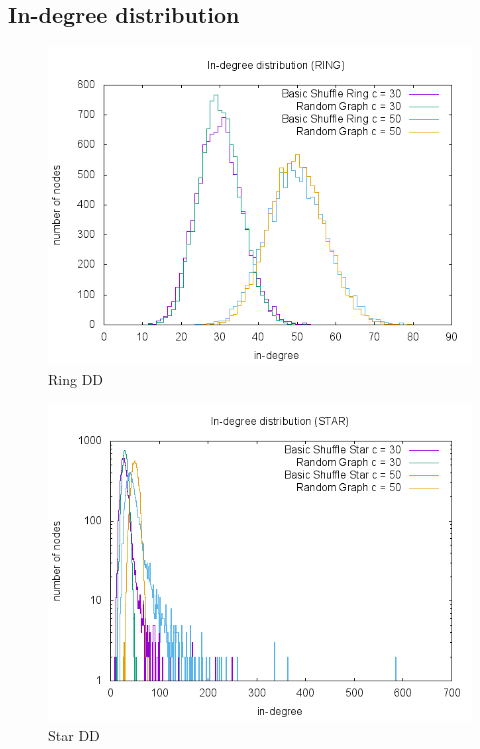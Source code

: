 \documentclass[UKenglish]{article}  %
\begin{document}
\subsection{In-degree distribution}
\begin{figure}
\includegraphics[scale=0.6]{plot/ringDD.png}
	\caption{Ring DD}
	\label{fig:ringDD}
\end{figure}

\begin{figure}
\includegraphics[scale=0.6]{plot/starDD.png}
	\caption{Star DD}
	\label{fig:starDD}
\end{figure}
\end{document}

